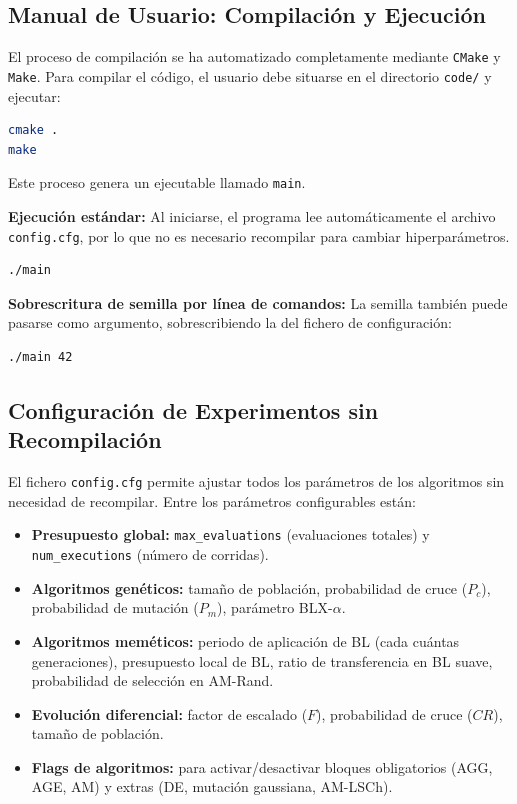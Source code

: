 \subsection{Manual de Usuario: Compilación y Ejecución}

El proceso de compilación se ha automatizado completamente mediante \texttt{CMake} y \texttt{Make}. Para compilar el código, el usuario debe situarse en el directorio \texttt{code/} y ejecutar:

\begin{lstlisting}[language=bash, frame=single]
cmake .
make
\end{lstlisting}

Este proceso genera un ejecutable llamado \texttt{main}.

\textbf{Ejecución estándar:} Al iniciarse, el programa lee automáticamente el archivo \texttt{config.cfg}, por lo que no es necesario recompilar para cambiar hiperparámetros.

\begin{lstlisting}[language=bash, frame=single]
./main
\end{lstlisting}

\textbf{Sobrescritura de semilla por línea de comandos:} La semilla también puede pasarse como argumento, sobrescribiendo la del fichero de configuración:

\begin{lstlisting}[language=bash, frame=single]
./main 42
\end{lstlisting}

\subsection{Configuración de Experimentos sin Recompilación}

El fichero \texttt{config.cfg} permite ajustar todos los parámetros de los algoritmos sin necesidad de recompilar. Entre los parámetros configurables están:

\begin{itemize}[noitemsep]
    \item \textbf{Presupuesto global:} \texttt{max\_evaluations} (evaluaciones totales) y \texttt{num\_executions} (número de corridas).
    \item \textbf{Algoritmos genéticos:} tamaño de población, probabilidad de cruce ($P_c$), probabilidad de mutación ($P_m$), parámetro BLX-$\alpha$.
    \item \textbf{Algoritmos meméticos:} periodo de aplicación de BL (cada cuántas generaciones), presupuesto local de BL, ratio de transferencia en BL suave, probabilidad de selección en AM-Rand.
    \item \textbf{Evolución diferencial:} factor de escalado ($F$), probabilidad de cruce ($CR$), tamaño de población.
    \item \textbf{Flags de algoritmos:} para activar/desactivar bloques obligatorios (AGG, AGE, AM) y extras (DE, mutación gaussiana, AM-LSCh).
\end{itemize}

